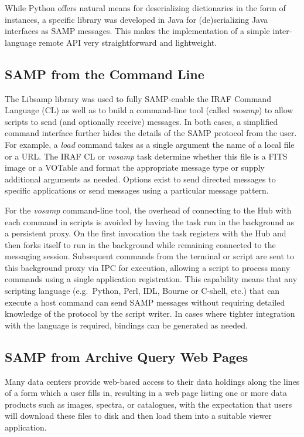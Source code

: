 While Python offers natural means for deserializing dictionaries in the form of instances, a specific library was developed in Java for (de)serializing Java interfaces as SAMP messages. This makes the implementation of a simple inter-language remote API very straightforward and lightweight.

\subsection{SAMP from the Command Line}

The Libsamp library was used to fully SAMP-enable the IRAF Command Language (CL) as well as to build a command-line tool (called {\em vosamp\/}) to allow scripts to send (and optionally receive) messages.  In both cases, a simplified command interface further hides the details of the SAMP protocol from the user.  For example, a {\em load\/} command takes as a single argument the name of a local file or a URL. The IRAF CL or {\em vosamp\/} task determine whether this file is a FITS image or a VOTable and format the appropriate message type or supply additional arguments as needed. Options exist to send directed messages to specific applications or send messages using a particular message pattern.

For the {\em vosamp\/} command-line tool, the overhead of connecting to the Hub with each command in scripts is avoided by having the task run in the background as a persistent proxy.  On the first invocation the task registers with the Hub and then forks itself to run in the background while remaining connected to the messaging session.  Subsequent commands from the terminal or script are sent to this background proxy via IPC for execution, allowing a script to process many commands using a single application registration.  This capability means that any scripting language (e.g.\ Python, Perl, IDL, Bourne or C-shell, etc.) that can execute a host command can send SAMP messages without requiring detailed knowledge of the protocol by the script writer.  In cases where tighter integration with the language is required, bindings can be generated as needed.

\subsection{SAMP from Archive Query Web Pages}

Many data centers provide web-based access to their data holdings along the lines of a form which a user fills in, resulting in a web page listing one or more data products such as images, spectra, or catalogues, with the expectation that users will download these files to disk and then load them into a suitable viewer application.

